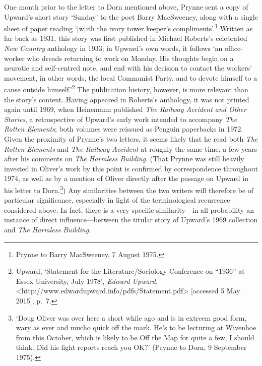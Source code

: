 \documentclass[]{article}
\begin{document}
One month prior to the letter to Dorn mentioned above, Prynne sent a
copy of Upward’s short story ‘Sunday’ to the poet Barry MacSweeney,
along with a single sheet of paper reading ‘{[}w{]}ith the ivory tower
keeper’s compliments’.\footnote{Prynne to Barry MacSweeney, 7 August
  1975.} Written as far back as 1931, this story was first published in
Michael Roberts’s celebrated \emph{New Country} anthology in 1933; in
Upward’s own words, it follows ‘an office-worker who dreads returning to
work on Monday. His thoughts begin on a neurotic and self-centred note,
and end with his decision to contact the workers’ movement, in other
words, the local Communist Party, and to devote himself to a cause
outside himself.’\footnote{Upward, ‘Statement for the
  Literature/Sociology Conference on “1936” at Essex University, July
  1978’, \emph{Edward Upward},
  \textless{}http://www.edwardupward.info/pdfs/Statement.pdf\textgreater{}
  {[}accessed 5 May 2015{]}, p.~7.} The publication history, however, is
more relevant than the story’s content. Having appeared in Roberts’s
anthology, it was not printed again until 1969, when Heinemann published
\emph{The Railway Accident and Other Stories}, a retrospective of
Upward’s early work intended to accompany \emph{The Rotten Elements};
both volumes were reissued as Penguin paperbacks in 1972. Given the
proximity of Prynne’s two letters, it seems likely that he read both
\emph{The Rotten Elements} and \emph{The Railway Accident} at roughly
the same time, a few years after his comments on \emph{The Harmless
Building}. (That Prynne was still heavily invested in Oliver’s work by
this point is confirmed by correspondence throughout 1974, as well as by
a mention of Oliver directly after the passage on Upward in his letter
to Dorn.\footnote{‘Doug Oliver was over here a short while ago and is in
  extreem good form, wary as ever and mucho quick off the mark. He’s to
  be lecturing at Wivenhoe from this October, which is likely to be Off
  the Map for quite a few, I should think. Did his fight reports reach
  you OK?’ (Prynne to Dorn, 9 September 1975).}) Any similarities
between the two writers will therefore be of particular significance,
especially in light of the terminological recurrence considered above.
In fact, there is a very specific similarity—in all probability an
instance of direct influence—between the titular story of Upward’s 1969
collection and \emph{The Harmless Building}.
\end{document}
